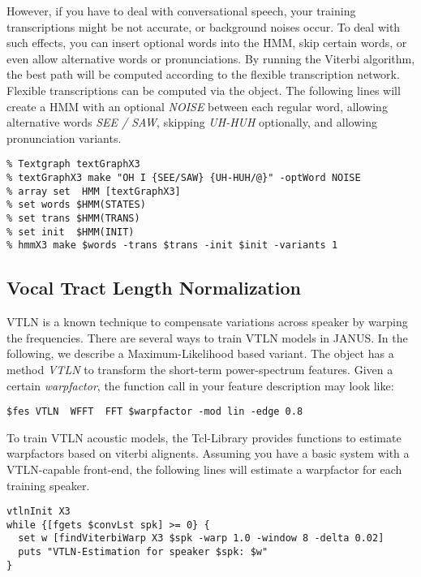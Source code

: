 However, if you have to deal with conversational speech, your training
transcriptions might  be not accurate, or  background noises occur. To
deal  with such effects, you can  insert optional words  into the HMM,
skip   certain      words,  or even      allow alternative    words or
pronunciations. By  running the Viterbi algorithm,  the best path will
be computed according  to the flexible transcription network. Flexible
transcriptions  can  be   computed  via  the  
object. The  following lines will create a  HMM with  an optional {\em
NOISE} between each regular word, allowing  alternative words {\em SEE
/ SAW}, skipping  {\em UH-HUH} optionally,  and allowing pronunciation
variants.

\begin{verbatim}
% Textgraph textGraphX3
% textGraphX3 make "OH I {SEE/SAW} {UH-HUH/@}" -optWord NOISE
% array set  HMM [textGraphX3]
% set words $HMM(STATES)
% set trans $HMM(TRANS)
% set init  $HMM(INIT)
% hmmX3 make $words -trans $trans -init $init -variants 1
\end{verbatim}

\subsection{Vocal Tract Length Normalization}

VTLN  is a known technique  to compensate variations across speaker by
warping the frequencies. There are  several ways to train VTLN  models
in JANUS. In  the  following, we  describe a Maximum-Likelihood  based
variant.  The object  has a method {\em VTLN}
to transform the short-term  power-spectrum features. Given a  certain
{\em warpfactor},  the function call  in  your feature description may
look like:

\begin{verbatim}
$fes VTLN  WFFT  FFT $warpfactor -mod lin -edge 0.8
\end{verbatim}

To train VTLN  acoustic models, the  Tcl-Library provides functions to
estimate  warpfactors based on  viterbi alignents. Assuming you have a
basic system  with a VTLN-capable front-end,  the following lines will
estimate a warpfactor for each training speaker.

\begin{verbatim}
vtlnInit X3
while {[fgets $convLst spk] >= 0} {
  set w [findViterbiWarp X3 $spk -warp 1.0 -window 8 -delta 0.02]
  puts "VTLN-Estimation for speaker $spk: $w"
}
\end{verbatim}

